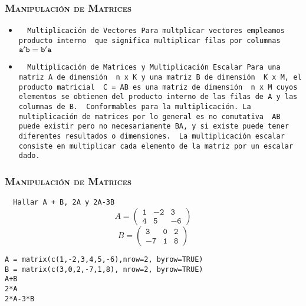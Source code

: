 \documentclass[16.5pt]{beamer}
\begin{document}

{
\begin{frame}
\frametitle{\textsc{\textbf{Manipulación de Matrices}}}
\hspace*{-5mm}
\vspace*{-5mm} 
\vspace{0.3cm}

\begin{itemize}

\item \texttt{ {\color{blue} Multiplicación de Vectores} Para multplicar vectores empleamos {\color{black} producto interno } que significa multiplicar filas por columnas} $ \color{black} \mathtt{a'b = b'a}$
\item \texttt{ {\color{blue} Multiplicación de Matrices y Multiplicación Escalar} Para una matriz A de dimensión  {\color{blue} n x K} y una matriz B de dimensión  {\color{blue} K x M}, el producto matricial  {\color{blue} C = AB} es una matriz de dimensión   {\color{blue} n x M} cuyos elementos se obtienen del producto interno de las filas de A y las columnas de B.  {\color{blue} Conformables para la multiplicación}. La multiplicación de matrices por lo general es no comutativa  {\color{blue} AB puede existir pero no necesariamente BA, y si existe puede tener diferentes resultados o dimensiones}.  {\color{red} La multiplicación escalar} consiste en multiplicar cada elemento de la matriz por un escalar dado.}
\end{itemize}

\end{frame}
}
{
\begin{frame}
\frametitle{\textsc{\textbf{Manipulación de Matrices}}}
\hspace*{-5mm}
\vspace*{-5mm} 
\vspace{0.3cm}


\texttt{  {\color{red} Hallar A + B, 2A y 2A-3B} }
$$A= \mathtt{\begin{pmatrix} 1 & -2 & 3  \\ 4 & 5 & -6   \end{pmatrix}}$$
$$B= \mathtt{\begin{pmatrix} 3 & 0 & 2  \\ -7 & 1 & 8   \end{pmatrix}}$$

\begin{lstlisting}
A = matrix(c(1,-2,3,4,5,-6),nrow=2, byrow=TRUE)
B = matrix(c(3,0,2,-7,1,8), nrow=2, byrow=TRUE)
A+B
2*A
2*A-3*B
\end{lstlisting}


\end{frame}
}
\end{document}
